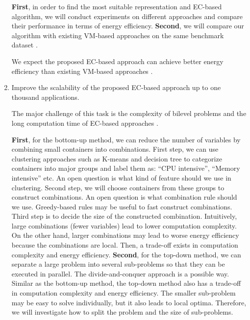 \begin{enumerate}
	 \textbf{First}, in order to find the most suitable representation and EC-based algorithm, we will conduct experiments on different approaches and compare their performance in terms of energy efficiency. \textbf{Second}, we will compare our algorithm with existing VM-based approaches on the same benchmark dataset \cite{Shen:2015hm}. 

	 We expect the proposed EC-based approach can achieve better energy efficiency than existing VM-based approaches \cite{Wilcox:2011ea, Xu:2010vh}.

	\item Improve the scalability of the proposed EC-based approach up to one thousand applications.

	The major challenge of this task is the complexity of bilevel problems and the long computation time of EC-based approaches \cite{Sinha:2017et}. 

	 \textbf{First}, for the bottom-up method, we can reduce the number of variables by combining small containers
	into combinations. First step, we can use clustering approaches such as K-means \cite{Xie:2011fj} and decision tree to categorize containers into major groups and label them as: ``CPU intensive'', ``Memory intensive'' etc. An open question is what kind of feature should we use in clustering.  Second step, we will choose containers from these groups to construct combinations. An open question is what combination rule should we use. Greedy-based rules may be useful to fast construct combinations. Third step is to decide the size of the constructed combination. Intuitively, large combinations (fewer variables) lead to lower computation complexity. On the other hand, larger combinations may lead to worse energy efficiency because the combinations are local. Then, a trade-off exists in computation complexity and energy efficiency. 
	\textbf{Second}, for the top-down method, we can separate a large problem into several sub-problems so that they can be executed in parallel. The divide-and-conquer approach is a possible way. Similar as the bottom-up method, the top-down method also has a trade-off in computation complexity and energy efficiency. The smaller sub-problem may be easy to solve individually, but it also leads to local optima.  Therefore, we will investigate how to split the problem and the size of sub-problems. 


\end{enumerate}

